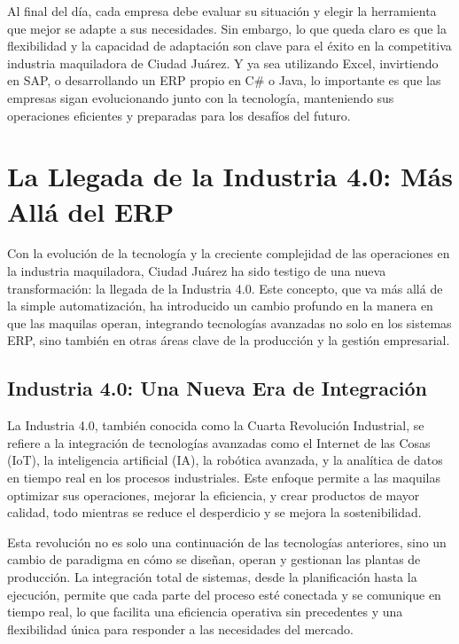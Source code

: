 \documentclass[
  10pt,
  letterpaper,
]{book}
\begin{document}
Al final del día, cada empresa debe evaluar su situación y elegir la
herramienta que mejor se adapte a sus necesidades. Sin embargo, lo que
queda claro es que la flexibilidad y la capacidad de adaptación son
clave para el éxito en la competitiva industria maquiladora de Ciudad
Juárez. Y ya sea utilizando Excel, invirtiendo en SAP, o desarrollando
un ERP propio en C\# o Java, lo importante es que las empresas sigan
evolucionando junto con la tecnología, manteniendo sus operaciones
eficientes y preparadas para los desafíos del futuro.

\section{La Llegada de la Industria 4.0: Más Allá del
ERP}\label{la-llegada-de-la-industria-4.0-muxe1s-alluxe1-del-erp}

Con la evolución de la tecnología y la creciente complejidad de las
operaciones en la industria maquiladora, Ciudad Juárez ha sido testigo
de una nueva transformación: la llegada de la Industria 4.0. Este
concepto, que va más allá de la simple automatización, ha introducido un
cambio profundo en la manera en que las maquilas operan, integrando
tecnologías avanzadas no solo en los sistemas ERP, sino también en otras
áreas clave de la producción y la gestión empresarial.

\subsection{Industria 4.0: Una Nueva Era de
Integración}\label{industria-4.0-una-nueva-era-de-integraciuxf3n}

La Industria 4.0, también conocida como la Cuarta Revolución Industrial,
se refiere a la integración de tecnologías avanzadas como el Internet de
las Cosas (IoT), la inteligencia artificial (IA), la robótica avanzada,
y la analítica de datos en tiempo real en los procesos industriales.
Este enfoque permite a las maquilas optimizar sus operaciones, mejorar
la eficiencia, y crear productos de mayor calidad, todo mientras se
reduce el desperdicio y se mejora la sostenibilidad.

Esta revolución no es solo una continuación de las tecnologías
anteriores, sino un cambio de paradigma en cómo se diseñan, operan y
gestionan las plantas de producción. La integración total de sistemas,
desde la planificación hasta la ejecución, permite que cada parte del
proceso esté conectada y se comunique en tiempo real, lo que facilita
una eficiencia operativa sin precedentes y una flexibilidad única para
responder a las necesidades del mercado.
\end{document}
